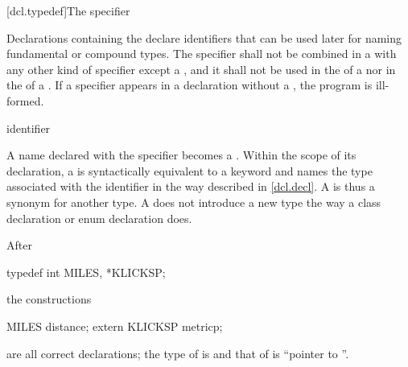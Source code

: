 [dcl.typedef]{The  specifier}%

\pnum
Declarations containing the  
declare identifiers that can be used later for naming
fundamental or compound
types. The  specifier shall not be
combined in a  with any other kind of
specifier except a , and it shall not be used in the
 of a
 nor in the
 of a
.
If a  specifier appears in a declaration without a ,
the program is ill-formed.

\begin{bnf}
\br
    identifier
\end{bnf}

A name declared with the  specifier becomes a
. Within the scope of its declaration, a
 is syntactically equivalent to a keyword and
names the type associated with the identifier in the way described in
\ref{dcl.decl}.
%
%
%
A  is thus a synonym for another type. A
 does not introduce a new type the way a class
declaration or enum declaration does.
\begin{example}
After

\begin{codeblock}
typedef int MILES, *KLICKSP;
\end{codeblock}

the constructions

\begin{codeblock}
MILES distance;
extern KLICKSP metricp;
\end{codeblock}

are all correct declarations; the type of  is
 and that of  is ``pointer to ''.
\end{example}

